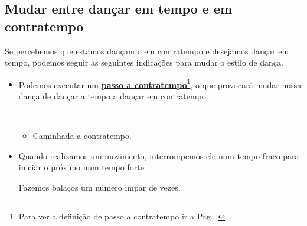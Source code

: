 \subsection{Mudar entre dançar em tempo e em contratempo}
Se percebemos  que estamos dançando em contratempo e desejamos dançar em tempo,
podemos seguir as seguintes indicações para mudar o estilo de dança.
\begin{itemize}
\item Podemos executar um \hyperref[def:PassoAContratempo]{\textbf{passo a contratempo}}\footnote{ Para 
ver a definição de passo a contratempo ir a Pag. \pageref{def:PassoAContratempo}.},
o que provocará mudar nossa dança de dançar a tempo a dançar em contratempo.
\begin{example}~
\begin{itemize}
\item Caminhada a contratempo.
\end{itemize}
\end{example}
\item Quando realizamos um movimento, interrompemos ele num tempo fraco 
para iniciar o próximo num tempo forte.
\begin{example}
Fazemos balaços um número impar de vezes.
\end{example}
\end{itemize}



